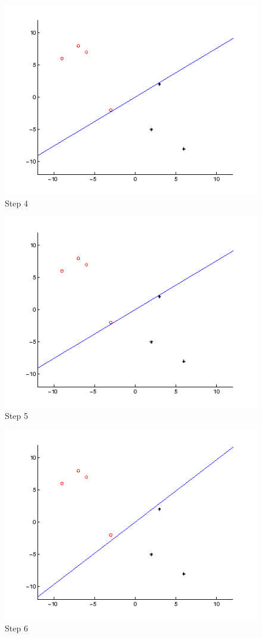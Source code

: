 \begin{figure}
\centering{}\includegraphics[width=1\textwidth]{plots/6_4}\caption{Step 4}
\end{figure}
\begin{figure}
\centering{}\includegraphics[width=1\textwidth]{plots/6_4}\caption{Step 5}
\end{figure}
\begin{figure}
\centering{}\includegraphics[width=1\textwidth]{plots/6_6}\caption{Step 6}
\end{figure}
